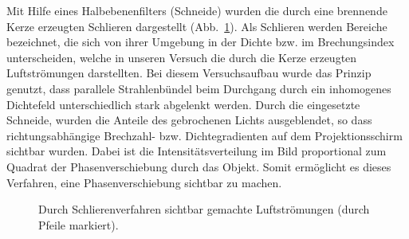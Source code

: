 Mit Hilfe eines Halbebenenfilters (Schneide) wurden die durch   eine brennende Kerze erzeugten Schlieren dargestellt (Abb.~\ref{fig:luftstroemungen}). Als Schlieren werden Bereiche bezeichnet, die sich von ihrer Umgebung  in  der  Dichte  bzw.  im  Brechungsindex  unterscheiden,  welche  in  unseren Versuch die durch  die  Kerze erzeugten Luftströmungen darstellten. Bei diesem Versuchsaufbau  wurde  das  Prinzip  genutzt,  dass  parallele  Strahlenbündel  beim  Durchgang durch   ein   inhomogenes Dichtefeld   unterschiedlich   stark   abgelenkt   werden.   Durch   die eingesetzte  Schneide,  wurden  die  Anteile  des  gebrochenen  Lichts  ausgeblendet,  so  dass richtungsabhängige  Brechzahl-  bzw.  Dichtegradienten auf  dem  Projektionsschirm  sichtbar wurden. Dabei ist die Intensitätsverteilung im   Bild   proportional   zum   Quadrat   der Phasenverschiebung   durch   das   Objekt.   Somit   ermöglicht es dieses Verfahren, eine Phasenverschiebung sichtbar zu machen. 

\begin{figure}[h]
	\centering
	\caption[Durch Schlierenverfahren sichtbar gemachte Luftströmungen]{
		Durch Schlierenverfahren sichtbar gemachte Luftströmungen (durch Pfeile markiert).
	}
	\label{fig:luftstroemungen}
\end{figure}